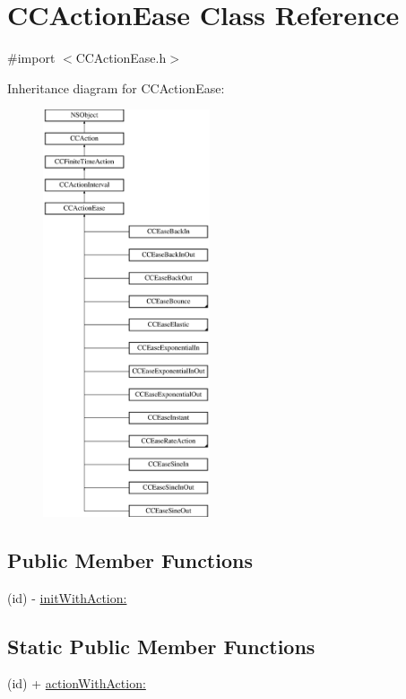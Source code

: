 \hypertarget{interface_c_c_action_ease}{\section{C\-C\-Action\-Ease Class Reference}
\label{interface_c_c_action_ease}
}


{\ttfamily \#import $<$C\-C\-Action\-Ease.\-h$>$}

Inheritance diagram for C\-C\-Action\-Ease\-:\begin{figure}[H]
\begin{center}
\leavevmode
\includegraphics[height=12.000000cm]{interface_c_c_action_ease}
\end{center}
\end{figure}
\subsection*{Public Member Functions}
\begin{DoxyCompactItemize}
\item 
(id) -\/ \hyperlink{interface_c_c_action_ease_acb5b5444204e3d7a4ee70fd3a4e3e123}{init\-With\-Action\-:}
\end{DoxyCompactItemize}
\subsection*{Static Public Member Functions}
\begin{DoxyCompactItemize}
\item 
(id) + \hyperlink{interface_c_c_action_ease_a1ac3b52143a61e2bd65b292817a4f14b}{action\-With\-Action\-:}
\end{DoxyCompactItemize}
